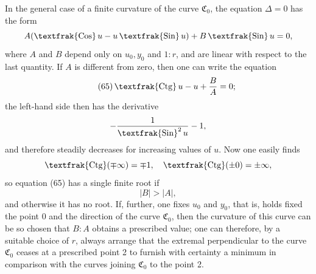 \documentclass[11pt,a4paper,leqno]{article}
\newcommand{\Cof}{\mathop{\text{\textfrak{Cos}}}\nolimits}
\newcommand{\Sin}{\mathop{\text{\textfrak{Sin}}}\nolimits}
\newcommand{\Ctg}{\mathop{\text{\textfrak{Ctg}}}\nolimits}
\begin{document}
In the general case of a finite curvature of the curve $\mathfrak{C}_0$, the equation $\Delta=0$ has the form
\[
A(\Cof u-u\Sin u)+B\Sin u=0,
\]
where $A$ and $B$ depend only on $u_0,y_0$ and $1:r$, and are linear with respect to the last quantity. If $A$ is different from zero, then one can write the equation
\begin{equation}\tag{65}
\Ctg u-u+\frac{B}{A}=0;
\end{equation}
the left-hand side then has the derivative
\[
-\frac{1}{\Sin^2u}-1,
\]
and therefore steadily decreases for increasing values of $u$. Now one easily finds
\[
\Ctg(\mp\infty)=\mp1,\quad \Ctg(\pm0)=\pm\infty,
\]
so equation (65) has a single finite root if
\[
|B|>|A|,
\]
and otherwise it has no root. If, further, one fixes $u_0$ and $y_0$, that is, holds fixed the point 0 and the direction of the curve $\mathfrak{C}_0$, then the curvature of this curve can be so chosen that $B:A$ obtains a prescribed value; one can therefore, by a suitable choice of $r$, always arrange that the extremal perpendicular to the curve $\mathfrak{C}_0$ ceases at a prescribed point 2 to furnish with certainty a minimum in comparison with the curves joining $\mathfrak{C}_0$ to the point 2.
\end{document}
